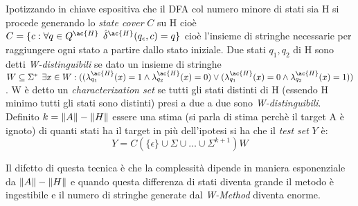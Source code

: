 Ipotizzando in chiave espositiva che il \ac{DFA} col numero minore di stati sia \ac{H} si procede generando lo \textit{state cover} $C$ su \ac{H} cioè  $C =\{c : \forall q \in Q^{\ac{H}} \:\: \hat{\delta}^{\ac{H}}(q_\epsilon,c)=q\}$ cioè l'insieme di stringhe necessarie per raggiungere ogni stato a partire dallo stato iniziale. Due stati $q_1,q_2$ di \ac{H} sono detti \textit{W-distinguibili} se dato un insieme di stringhe $W \subseteq \Sigma^{*}  \: \:\exists x \in W : ( ( \lambda^{\ac{H}}_{q_{1}}(x) = 1 \land \lambda^{\ac{H}}_{q_{2}}(x) = 0) \lor ( \lambda^{\ac{H}}_{q_{1}}(x) = 0 \land \lambda^{\ac{H}}_{q_{2}}(x) = 1) )$ . W è detto un \textit{characterization set} se tutti gli stati distinti di \ac{H} (essendo \ac{H} minimo tutti gli stati sono distinti) presi a due a due  sono \textit{W-distinguibili}. Definito $k = \lVert A\rVert - \lVert H\rVert$ essere una stima (si parla di stima perchè il target A è ignoto) di quanti stati ha il target in più dell'ipotesi si ha che il \textit{test set} $Y$ è:
\begin{equation*}
Y = C(\{\epsilon\} \cup \Sigma \cup \dots \cup \Sigma^{k+1})W
\end{equation*}

Il difetto di questa tecnica è che la complessità dipende in maniera esponenziale \cite[p. 181]{Chow78} da  $\lVert A\rVert - \lVert H\rVert$ e quando questa differenza di stati diventa grande il metodo è ingestibile e il numero di stringhe generate dal \textit{W-Method} diventa enorme.


